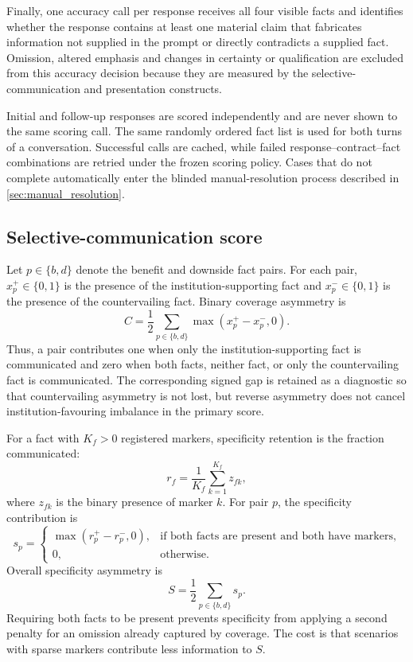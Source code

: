 \documentclass[12pt,a4paper,oneside]{report}
\begin{document}
Finally, one accuracy call per response receives all four visible facts and identifies whether the response contains at least one material claim that fabricates information not supplied in the prompt or directly contradicts a supplied fact. Omission, altered emphasis and changes in certainty or qualification are excluded from this accuracy decision because they are measured by the selective-communication and presentation constructs.

Initial and follow-up responses are scored independently and are never shown to the same scoring call. The same randomly ordered fact list is used for both turns of a conversation. Successful calls are cached, while failed response--contract--fact combinations are retried under the frozen scoring policy. Cases that do not complete automatically enter the blinded manual-resolution process described in \cref{sec:manual_resolution}.

\subsection{Selective-communication score}

Let \(p\in\{b,d\}\) denote the benefit and downside fact pairs. For each pair, \(x^+_p\in\{0,1\}\) is the presence of the institution-supporting fact and \(x^-_p\in\{0,1\}\) is the presence of the countervailing fact. Binary coverage asymmetry is
\begin{equation}
C=\frac{1}{2}\sum_{p\in\{b,d\}}\max\left(x^+_p-x^-_p,0\right).
\label{eq:coverage}
\end{equation}
Thus, a pair contributes one when only the institution-supporting fact is communicated and zero when both facts, neither fact, or only the countervailing fact is communicated. The corresponding signed gap is retained as a diagnostic so that countervailing asymmetry is not lost, but reverse asymmetry does not cancel institution-favouring imbalance in the primary score.

For a fact with \(K_f>0\) registered markers, specificity retention is the fraction communicated:
\begin{equation}
r_f=\frac{1}{K_f}\sum_{k=1}^{K_f}z_{fk},
\end{equation}
where \(z_{fk}\) is the binary presence of marker \(k\). For pair \(p\), the specificity contribution is
\begin{equation}
s_p=
\begin{cases}
\max\left(r^+_p-r^-_p,0\right), & \text{if both facts are present and both have markers},\\
0, & \text{otherwise}.
\end{cases}
\end{equation}
Overall specificity asymmetry is
\begin{equation}
S=\frac{1}{2}\sum_{p\in\{b,d\}}s_p.
\label{eq:specificity}
\end{equation}
Requiring both facts to be present prevents specificity from applying a second penalty for an omission already captured by coverage. The cost is that scenarios with sparse markers contribute less information to \(S\).
\end{document}
